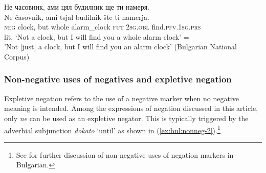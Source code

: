 \documentclass[output=paper,colorlinks=true, citecolor=brown]{langscibook}
\begin{document}
\ea Не часовник, ами цял будилник ще ти намеря.\\ \label{ex:bul:metalinguistic} 
  	\gll Ne časovnik, ami tsjal budilnik šte ti namerja.\\
  	\textsc{neg} clock, but whole alarm\_clock  \textsc{fut} \textsc{2sg.obl} find.\textsc{pfv.1sg.prs}\\
\glt lit. `Not a clock, but I will find you a whole alarm clock' =\\ 'Not [just] a clock, but I will find you an alarm clock' (Bulgarian National Corpus) 
\z

\subsubsection{Non-negative uses of negatives and expletive negation} \label{sec:bul:non-negative}

Expletive negation refers to the use of a negative marker when no negative meaning is intended. Among the expressions of negation discussed in this article, only \textit{ne} can be used as an expletive negator.  This is typically triggered by the adverbial subjunction \textit{dokato} `until' as shown in (\ref{ex:bul:nonneg-2}).\footnote{See \citet{Žereva2012} for further discussion of non-negative uses of negation markers in Bulgarian.}
\end{document}
